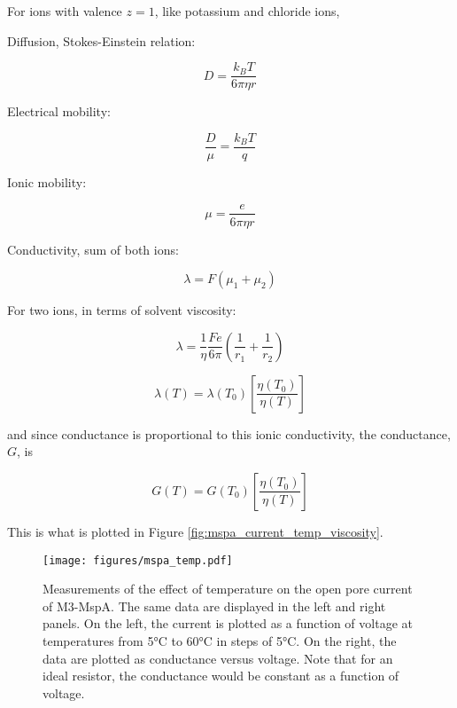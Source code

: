 For ions with valence $z=1$, like potassium and chloride ions,

Diffusion, Stokes-Einstein relation:

\begin{equation}
D = \frac{k_B T}{6\pi\eta r}
\label{eqn:conductivity}
\end{equation}

Electrical mobility:

\begin{equation}
\frac{D}{\mu} = \frac{k_B T}{q}
\label{eqn:einstein_mobility}
\end{equation}

Ionic mobility:

\begin{equation}
\mu = \frac{e}{6 \pi \eta r}
\label{eqn:mobility}
\end{equation}

Conductivity, sum of both ions:

\begin{equation}
\lambda = F(\mu_1 + \mu_2)
\label{eqn:conductivity}
\end{equation}

For two ions, in terms of solvent viscosity:

\begin{equation}
\lambda = \frac{1}{\eta} \frac{Fe}{6\pi} \left( \frac{1}{r_1}+\frac{1}{r_2} \right)
\label{eqn:conductivity_eta}
\end{equation}

\begin{equation}
\lambda(T) = \lambda(T_0) \left[ \frac{\eta(T_0)}{\eta(T)} \right]
\label{eqn:conductivity_temp}
\end{equation}

and since conductance is proportional to this ionic conductivity, the conductance, $G$, is

\begin{equation}
G(T) = G(T_0) \left[ \frac{\eta(T_0)}{\eta(T)} \right]
\label{eqn:conductance_temp}
\end{equation}

This is what is plotted in Figure \ref{fig:mspa_current_temp_viscosity}.

\begin{figure}[h]
\begin{centering}
\texttt{[image: figures/mspa\_temp.pdf]}
\caption[MspA current versus temperature]{Measurements of the effect of temperature on the open pore current of M3-MspA.  The same data are displayed in the left and right panels.  On the left, the current is plotted as a function of voltage at temperatures from 5°C to 60°C in steps of 5°C.  On the right, the data are plotted as conductance versus voltage.  Note that for an ideal resistor, the conductance would be constant as a function of voltage.}
\label{fig:mspa_current_temp}
\end{centering}
\end{figure}

